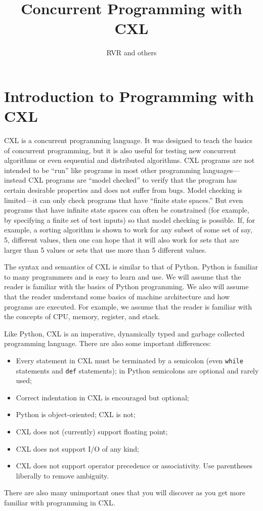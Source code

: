 \documentclass{report}
\title{Concurrent Programming with CXL}
\author{RVR and others}
\begin{document}
\maketitle

\chapter{Introduction to Programming with CXL}

CXL is a concurrent programming language.  It was designed to teach
the basics of concurrent programming, but it is also useful for
testing new concurrent algorithms or even sequential and distributed
algorithms.  CXL programs are not intended to be ``run'' like programs
in most other programming languages---instead CXL programs are
``model checked'' to verify that the program has certain desirable
properties and does not suffer from bugs.  Model checking is
limited---it can only check programs that have ``finite state
spaces.''  But even programs that have infinite state spaces can
often be constrained (for example, by specifying a finite set of
test inputs) so that model checking is possible.  If, for
example, a sorting algorithm is shown to work for any subset of
some set of say, 5, different values, then one can hope that it
will also work for sets that are larger than 5 values or sets that
use more than 5 different values.

The syntax and semantics of CXL is similar to that of Python.
Python is familiar to many programmers and is easy to learn and
use.  We will assume that the reader is familiar with the basics
of Python programming.  We also will assume that the reader
understand some basics of machine architecture and how programs
are executed.  For example, we assume that the reader is familiar
with the concepts of CPU, memory, register, and stack.

Like Python, CXL is an imperative,
dynamically typed and garbage collected programming language.
There are also some important differences:
\begin{itemize}
\item Every statement in CXL must be terminated by a semicolon
(even \texttt{while} statements and \texttt{def} statements);
in Python semicolons are optional and rarely used;
\item Correct indentation in CXL is encouraged but optional;
\item Python is object-oriented; CXL is not;
\item CXL does not (currently) support floating point;
\item CXL does not support I/O of any kind;
\item CXL does not support operator precedence or associativity.  Use
parentheses liberally to remove ambiguity.
\end{itemize}
There are also many unimportant ones that you will discover as
you get more familiar with programming in CXL.
\end{document}
